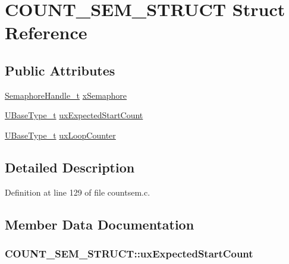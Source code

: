 \hypertarget{struct_c_o_u_n_t___s_e_m___s_t_r_u_c_t}{}\section{C\+O\+U\+N\+T\+\_\+\+S\+E\+M\+\_\+\+S\+T\+R\+U\+CT Struct Reference}
\label{struct_c_o_u_n_t___s_e_m___s_t_r_u_c_t}
\subsection*{Public Attributes}
\begin{DoxyCompactItemize}
\item 
\hyperlink{semphr_8h_ad88c6df4a04beedeac782918c8a332f5}{Semaphore\+Handle\+\_\+t} \hyperlink{struct_c_o_u_n_t___s_e_m___s_t_r_u_c_t_aafa3f894de13cc6a6c197790ca8d13e9}{x\+Semaphore}
\item 
\hyperlink{portmacro_8h_a646f89d4298e4f5afd522202b11cb2e6}{U\+Base\+Type\+\_\+t} \hyperlink{struct_c_o_u_n_t___s_e_m___s_t_r_u_c_t_a097f632892268e332a764d22416c7fca}{ux\+Expected\+Start\+Count}
\item 
\hyperlink{portmacro_8h_a646f89d4298e4f5afd522202b11cb2e6}{U\+Base\+Type\+\_\+t} \hyperlink{struct_c_o_u_n_t___s_e_m___s_t_r_u_c_t_a833a25b7177bc8bc7d04d2685459213e}{ux\+Loop\+Counter}
\end{DoxyCompactItemize}


\subsection{Detailed Description}


Definition at line 129 of file countsem.\+c.



\subsection{Member Data Documentation}
\subsubsection[{\texorpdfstring{ux\+Expected\+Start\+Count}{uxExpectedStartCount}}]{ C\+O\+U\+N\+T\+\_\+\+S\+E\+M\+\_\+\+S\+T\+R\+U\+C\+T\+::ux\+Expected\+Start\+Count}\hypertarget{struct_c_o_u_n_t___s_e_m___s_t_r_u_c_t_a097f632892268e332a764d22416c7fca}{}\label{struct_c_o_u_n_t___s_e_m___s_t_r_u_c_t_a097f632892268e332a764d22416c7fca}


